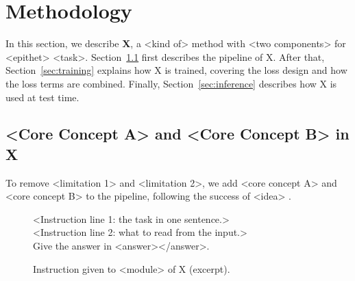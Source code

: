 \section{Methodology}
In this section, we describe \textbf{X}, a <kind of> method with <two components> for <epithet> <task>.
Section~\ref{sec:workflow} first describes the pipeline of X.
After that, Section~\ref{sec:training} explains how X is trained, covering the loss design and how the loss terms are combined.
Finally, Section~\ref{sec:inference} describes how X is used at test time.

\subsection{<Core Concept A> and <Core Concept B> in X} \label{sec:workflow}
To remove <limitation 1> and <limitation 2>, we add <core concept A> and <core concept B> to the pipeline, following the success of <idea> \cite{Placeholder-C}.

\begin{figure}[t]
    \centering
    \begin{shadowpromptbox}
    \raggedright\small\ttfamily
    <Instruction line 1: the task in one sentence.> \\
    <Instruction line 2: what to read from the input.> \\
    Give the answer in <answer></answer>.
    \end{shadowpromptbox}
    \caption{Instruction given to <module> of X (excerpt).}
    \label{fig:prompt}
\end{figure}

